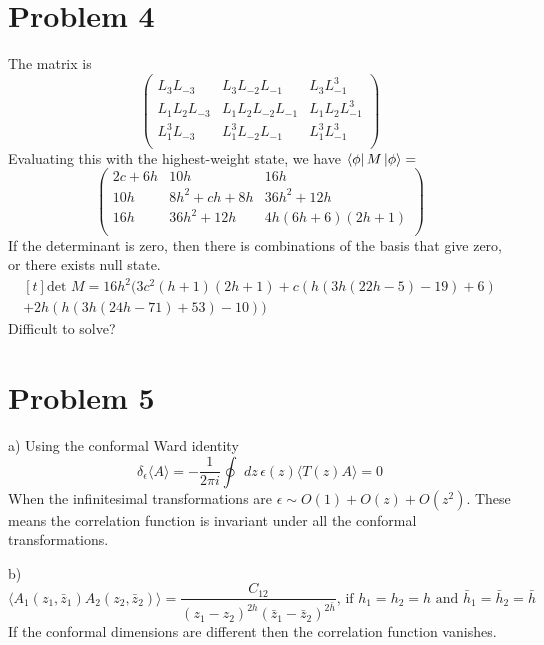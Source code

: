 \documentclass[12pt]{article}
\begin{document}
\section{Problem 4}
The matrix is 
\begin{equation}
\left(
\begin{array}{ccc}
 L_3 L_{-3} & L_3 L_{-2} L_{-1} & L_3 L_{-1}^3 \\
 L_1 L_2 L_{-3} & L_1 L_2 L_{-2} L_{-1} & L_1 L_2 L_{-1}^3 \\
 L_1^3 L_{-3} & L_1^3 L_{-2} L_{-1} & L_1^3 L_{-1}^3 \\
\end{array}
\right)
\end{equation}
Evaluating this with the highest-weight state, we have $\bra{\phi}M\ket{\phi}=$
\begin{equation}
\left(
\begin{array}{ccc}
 2 c+6 h & 10 h & 16 h \\
 10 h & 8 h^2+c h+8 h & 36 h^2+12 h \\
 16 h & 36 h^2+12 h & 4 h (6 h+6) (2 h+1) \\
\end{array}
\right)
\end{equation}
If the determinant is zero, then there is combinations of the basis that give zero, or there exists null state.
\begin{equation}
\begin{aligned}[t]
\text{det }M=16 h^2 (3 c^2 (h+1) (2 h+1)+c (h (3 h (22 h-5)-19)+6)\\
+2 h (h (3 h (24 h-71)+53)-10))
\end{aligned}
\end{equation}
Difficult to solve?
\section{Problem 5}
\begin{paragraph}{a)}
Using the conformal Ward identity
\begin{equation}
\delta_\epsilon\langle A\rangle=-\frac{1}{2\pi i}\oint\,\,dz \,\epsilon(z)\langle T(z)A\rangle=0
\end{equation}
When the infinitesimal transformations are $\epsilon\sim O(1)+O(z)+O(z^2)$. These means the correlation function is invariant under all the conformal transformations.
\end{paragraph}
\begin{paragraph}{b)}
\begin{equation}
\langle A_1(z_1,\bar{z}_1)A_2(z_2,\bar{z}_2)\rangle=\frac{C_{12}}{(z_1-z_2)^{2h}(\bar{z}_1-\bar{z}_2)^{2\bar{h}}} \text{,  if }h_1=h_2=h\text{ and }\bar{h}_1=\bar{h}_2=\bar{h}
\end{equation}
If the conformal dimensions are different then the correlation function vanishes.
\end{paragraph}
\end{document}

